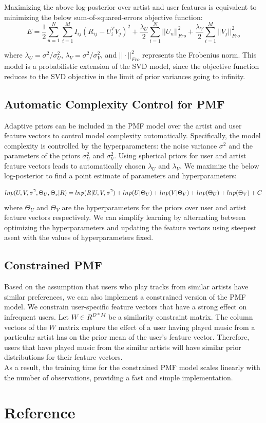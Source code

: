 \documentclass[11pt]{article}
\theoremstyle{definition}
\begin{document}
Maximizing the above log-posterior over artist and user features is equivalent to minimizing the below sum-of-squared-errors objective function:
$$E = \frac{1}{2}\sum_{u=1}^N \sum_{i=1}^M I_{ij}(R_{ij}-U_i^TV_j)^2 + \frac{\lambda_U}{2} \sum_{i=1}^N ||U_u||_{Fro}^2 + \frac{\lambda_V}{2} \sum_{i=1}^M||V_j||_{Fro}^2$$

where $\lambda_U = \sigma^2 / \sigma_U^2$, $\lambda_V = \sigma^2 / \sigma_V^2$, and $||\cdot||_{Fro}^2$ represents the Frobenius norm. This model is a probabilistic extension of the SVD model, since the objective function reduces to the SVD objective in the limit of prior variances going to infinity.

\subsection{\textbf{Automatic Complexity Control for PMF}}
Adaptive priors can be included in the PMF model over the artist and user feature vectors to control model complexity automatically. Specifically, the model complexity is controlled by the hyperparameters: the noise variance $\sigma^2$ and the parameters of the priors $\sigma_U^2$ and $\sigma_V^2$. Using spherical priors for user and artist feature vectors leads to automatically chosen $\lambda_U$ and $\lambda_V$. We maximize the below log-posterior to find a point estimate of parameters and hyperparameters:

$$
lnp(U,V,\sigma^2,\Theta_U, \Theta_v|R) =
ln{\it{p}}(R|U,V,\sigma^2)+ln{\it{p}}(U|\Theta_U)+ln{\it{p}}(V|\Theta_V)+ln{\it{p}}(\Theta_U)+ ln{\it{p}}(\Theta_V)+C
$$
where $\Theta_U$ and $\Theta_V$ are the hyperparameters for the priors over user and artist feature vectors respectively. We can simplify learning by alternating between optimizing the hyperparameters and updating the feature vectors using steepest asent with the values of hyperparameters fixed. 

\subsection{\textbf{Constrained PMF}}
Based on the assumption that users who play tracks from similar artists have similar preferences, we can also implement a constrained version of the PMF model. We constrain user-specific feature vectors that have a strong effect on infrequent users. Let $W\in R^{D*M}$ be a similarity constraint matrix. The column vectors of the $W$ matrix capture the effect of a user having played music from a particular artist has on the prior mean of the user's feature vector. Therefore, users that have played music from the similar artists will have similar prior distributions for their feature vectors.\\

As a result, the training time for the constrained PMF model scales linearly with the number of observations, providing a fast and simple implementation. 

\section{\textbf{Reference}}
\end{document}
